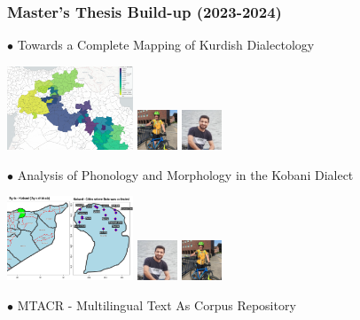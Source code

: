 \documentclass[aspectratio=169]{beamer}
\begin{document}
\begin{frame}[fragile]
	\frametitle{Master's Thesis Build-up (2023-2024)}
    \begin{minipage}{.49\textwidth}
        {\color{thiscolor}$\bullet$} Towards a Complete Mapping of Kurdish Dialectology \citep{schuler2023CompleteMappingKurdish}
        \begin{center}
            \includegraphics[height=2.5cm]{images/ickl6_dialectmapping.png}
            \includegraphics[height=1.2cm]{images/Christian_Schuler_Bike.JPG} 
            \includegraphics[height=1.2cm]{images/Raman_Ahmad.png} 
        \end{center}
    \end{minipage}\hfill%
    \begin{minipage}{.49\textwidth}
        {\color{thiscolor}$\bullet$} Analysis of Phonology and Morphology in the Kobani Dialect \citep{ahmad2023AnalysisPhonologyMorphology}
        \begin{center}
            \includegraphics[height=2.5cm]{images/ickl6_kobanianalysis.png}
            \includegraphics[height=1.2cm]{images/Raman_Ahmad.png} 
            \includegraphics[height=1.2cm]{images/Christian_Schuler_Bike.JPG} 
        \end{center}
    \end{minipage}

    \vspace{1cm}
    \begin{minipage}{1.0\textwidth}
    \centering
    {\color{thiscolor}$\bullet$} MTACR - Multilingual Text As Corpus Repository
    \end{minipage}
\end{frame}
\end{document}
